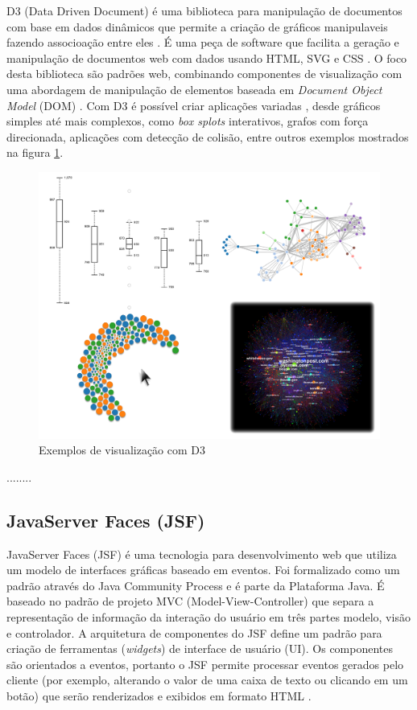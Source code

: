 D3 (Data Driven Document) é uma biblioteca para manipulação de documentos com base em dados dinâmicos que permite a criação de gráficos manipulaveis fazendo associoação entre eles \cite{d3site} \cite{zhu2013data}.  É  uma peça de software que facilita a geração e manipulação de documentos web com dados usando HTML, SVG e CSS \cite{murray2013interactive}. O foco desta biblioteca são padrões web, combinando componentes de visualização com uma abordagem de manipulação de elementos baseada em \textit{Document Object Model} (DOM) \cite{d3site} . Com D3 é possível criar aplicações variadas \cite{d3site}, desde gráficos simples até mais complexos, como  \textit{box splots} interativos, grafos com força direcionada, aplicações com detecção de colisão, entre outros exemplos mostrados na figura \ref{fig:d3exemplos}. 

\begin{figure}[!ht]
	\centering
	\includegraphics[width=1\columnwidth]{images/D3jsexemplos.png}
	\caption{Exemplos de visualização com D3  \cite{d3site}}
	\label{fig:d3exemplos}
\end{figure}

........
%

\subsection{JavaServer Faces (JSF)}

JavaServer Faces (JSF) \cite{burns2010javaserver} \cite{mann2013java} é uma tecnologia para desenvolvimento web que utiliza um modelo de interfaces gráficas baseado em eventos.  Foi formalizado como um padrão através do Java Community Process e é parte da Plataforma Java.  É baseado no padrão de projeto MVC (Model-View-Controller) que separa a representação de informação da interação do usuário em três partes modelo, visão e controlador.  A arquitetura de componentes do JSF define um padrão para criação de ferramentas (\textit{widgets}) de interface de usuário (UI). Os componentes são orientados a eventos, portanto o JSF permite processar eventos gerados pelo cliente (por exemplo, alterando o valor de uma caixa de texto ou clicando em um botão) que serão renderizados e exibidos em formato HTML \cite{geary2012core}.

